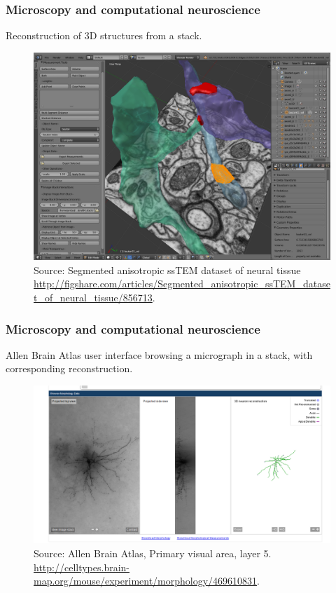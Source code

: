 \documentclass{beamer}
\begin{document}
\begin{frame}
\frametitle{Microscopy and computational neuroscience}

Reconstruction of 3D structures from a stack.

\begin{figure}[H]
    \centering
    \includegraphics[scale=0.2]{../blog/images/NeuroMorph_screenshot.png}
    \caption{Source: Segmented anisotropic ssTEM dataset of neural tissue
      \url{http://figshare.com/articles/Segmented_anisotropic_ssTEM_dataset_of_neural_tissue/856713}.}
    \label{fig:3d_stack}
\end{figure}

\end{frame}

\begin{frame}
\frametitle{Microscopy and computational neuroscience}

Allen Brain Atlas user interface browsing a micrograph in a stack,
with corresponding reconstruction.

\begin{figure}[H]
    \centering
    \includegraphics[scale=0.2]{../blog/images/allen_brain_atlas_primary_visual.png}
    \caption{Source: Allen Brain Atlas, Primary visual area, layer 5.
      \url{http://celltypes.brain-map.org/mouse/experiment/morphology/469610831}.}
    \label{fig:3d_stack}
\end{figure}

\end{frame}
\end{document}
